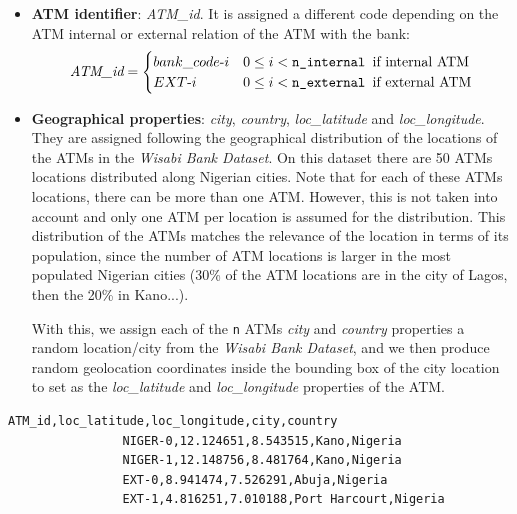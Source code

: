 \begin{itemize}
    \item \textbf{ATM identifier}: \emph{ATM\_id}. It is assigned a different code depending on the ATM internal or external relation of the ATM with the bank: 
        \[
        \emph{ATM\_id} =
        \begin{cases} 
        bank\_code \text{-} i & 0 \leq i < \texttt{n\_internal } \text{if internal ATM}  \\
        EXT \text{-} i & 0 \leq i < \texttt{n\_external } \text{if external ATM}
        \end{cases}
        \]
    \item \textbf{Geographical properties}: \emph{city}, \emph{country}, \emph{loc\_latitude}         and \emph{loc\_longitude}. 
        They are assigned following the geographical distribution of the locations of the ATMs in the \emph{Wisabi Bank Dataset}. 
        On this dataset there are 50 ATMs locations distributed along Nigerian cities. 
        Note that for each of these ATMs locations, there can be more than one ATM.
        However, this is not taken into account and only one ATM per location is assumed for the 
        distribution. This distribution of the ATMs matches the relevance of the location in terms of its population, since the number of ATM locations is larger in the most populated 
        Nigerian cities (30\% of the ATM locations are in the city of Lagos, then the 20\% in Kano...).
        
        
        With this, we assign each of the \texttt{n} ATMs \emph{city} and \emph{country} properties a random location/city from the \emph{Wisabi Bank Dataset}, and we then produce random geolocation coordinates inside the bounding box of the city location to set as the \emph{loc\_latitude} and \emph{loc\_longitude} properties of the ATM. \\
\end{itemize}

\begin{center}
\lstset{style=csvStyle}
\begin{lstlisting}[caption={Example of atm.csv}, label={csv:atm}]
                ATM_id,loc_latitude,loc_longitude,city,country
                NIGER-0,12.124651,8.543515,Kano,Nigeria
                NIGER-1,12.148756,8.481764,Kano,Nigeria
                EXT-0,8.941474,7.526291,Abuja,Nigeria
                EXT-1,4.816251,7.010188,Port Harcourt,Nigeria
\end{lstlisting}
\end{center}

